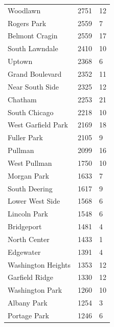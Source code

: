 \documentclass{article}
\begin{document}
\begin{table}[h!]
\begin{tabular}{|l|l|l|}
Woodlawn               & 2751             & 12               \\
Rogers Park            & 2559             & 7                \\
Belmont Cragin         & 2559             & 17               \\
South Lawndale         & 2410             & 10               \\
Uptown                 & 2368             & 6                \\
Grand Boulevard        & 2352             & 11               \\
Near South Side        & 2325             & 12               \\
Chatham                & 2253             & 21               \\
South Chicago          & 2218             & 10               \\
West Garfield Park     & 2169             & 18               \\
Fuller Park            & 2105             & 9                \\
Pullman                & 2099             & 16               \\
West Pullman           & 1750             & 10               \\
Morgan Park            & 1633             & 7                \\
South Deering          & 1617             & 9                \\
Lower West Side        & 1568             & 6                \\
Lincoln Park           & 1548             & 6                \\
Bridgeport             & 1481             & 4                \\
North Center           & 1433             & 1                \\
Edgewater              & 1391             & 4                \\
Washington Heights     & 1353             & 12               \\
Garfield Ridge         & 1330             & 12               \\
Washington Park        & 1260             & 10               \\
Albany Park            & 1254             & 3                \\
Portage Park           & 1246             & 6                \\
\hline
\end{tabular}
\end{table}
\end{document}
